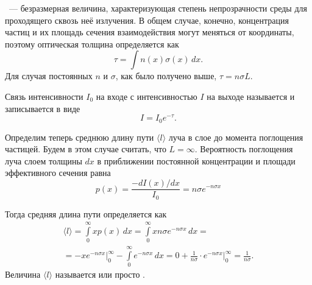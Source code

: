 ~--- безразмерная величина, характеризующая степень непрозрачности среды для проходящего сквозь неё излучения. В общем случае, конечно, концентрация частиц и их площадь сечения взаимодействия могут меняться от координаты, поэтому оптическая толщина определяется как
\begin{equation}
	\tau = \int n(x) \sigma(x)\,dx.
\end{equation}
Для случая постоянных $n$ и $\sigma$, как было получено выше, $\tau = n \sigma L$.

Связь интенсивности $I_0$ на входе с интенсивностью $I$ на выходе называется  и записывается в виде
\begin{equation}
	I = I_0 e^{-\tau}.
\end{equation}

Определим теперь среднюю длину пути $\langle l \rangle$ луча в слое до момента поглощения частицей. Будем в этом случае считать, что $L = \infty$. Вероятность поглощения луча слоем толщины $dx$ в приближении постоянной концентрации и площади эффективного сечения равна
\begin{equation*}
	p(x) = \frac{-dI(x) / dx}{I_0} = n \sigma e^{-n\sigma x}
\end{equation*}

Тогда средняя длина пути определяется как
\begin{multline*}
	\langle l \rangle 
	= \int\limits_0^\infty x p(x) \, dx 
	= \int\limits_0^\infty x n \sigma e^{-n\sigma x} \, dx =\\
	= - x e^{-n \sigma x}\big|_{0}^{\infty} -  \int\limits_0^\infty e^{-n\sigma x} \, dx 
	= 0 + \frac{1}{n \sigma} \cdot e^{-n \sigma x} \big|_0^\infty = \frac{1}{n \sigma}.
\end{multline*}
Величина $\langle l \rangle$ называется  или просто .

